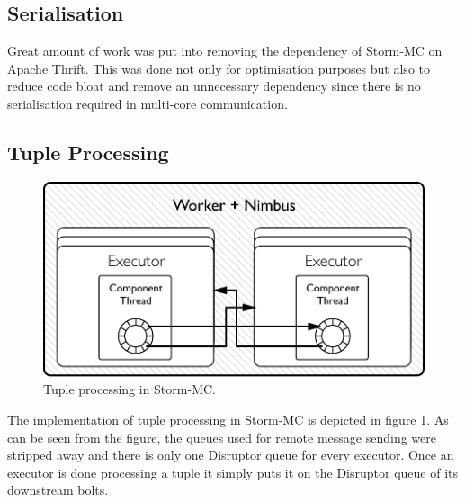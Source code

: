 \subsection{Serialisation}

Great amount of work was put into removing the dependency of Storm-MC on Apache Thrift. This was done not only for optimisation purposes but also to reduce code bloat and remove an unnecessary dependency since there is no serialisation required in multi-core communication.




%

\subsection{Tuple Processing}

\begin{figure}[!htb]
	\centering
	\includegraphics[scale=0.7]{pdf/worker_inside_mc.pdf}
	\caption{Tuple processing in Storm-MC.}
	\label{fig:worker_inside_mc}
\end{figure}

The implementation of tuple processing in Storm-MC is depicted in figure \ref{fig:worker_inside_mc}. As can be seen from the figure, the queues used for remote message sending were stripped away and there is only one Disruptor queue for every executor. Once an executor is done processing a tuple it simply puts it on the Disruptor queue of its downstream bolts.

